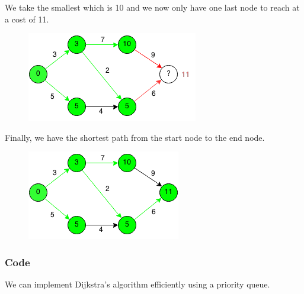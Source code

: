 \documentclass[11pt,oneside]{book}
\makeatletter
\def\maxwidth#1{\ifdim\Gin@nat@width>#1 #1\else\Gin@nat@width\fi}
\makeatother
\begin{document}
We take the smallest which is 10 and we now only have one last node to reach at a cost of 11.

\vspace{5px}\begin{figure}[H]\centering
        \includegraphics[width=0.66\maxwidth{\textwidth}]{djikstra5.png}
        \end{figure}

Finally, we have the shortest path from the start node to the end node.

\vspace{5px}\begin{figure}[H]\centering
        \includegraphics[width=0.66\maxwidth{\textwidth}]{djikstra6.png}
        \end{figure}

\subsubsection{Code}

We can implement Dijkstra's algorithm efficiently using a priority queue.
\end{document}
